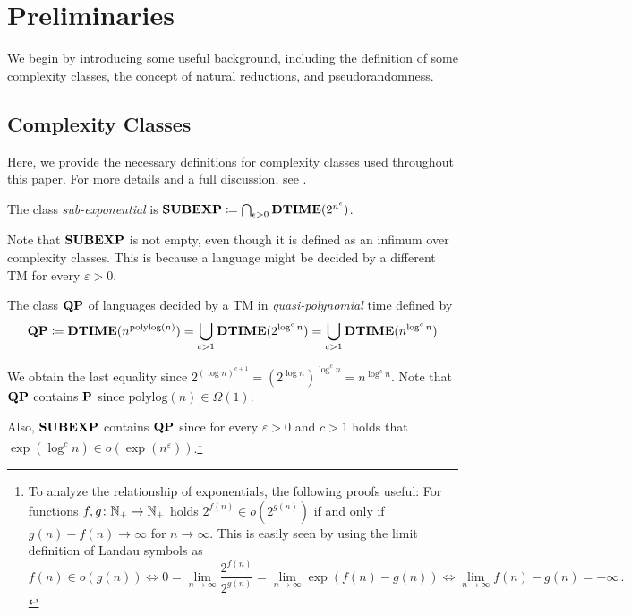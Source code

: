 \documentclass[11pt]{article}
\begin{document}
\section{Preliminaries}

We begin by introducing some useful background, including the definition
of some complexity classes, the concept of natural reductions,
and pseudorandomness.

\subsection{Complexity Classes}
Here, we provide the necessary definitions for complexity classes used
throughout this paper.
For more details and a full discussion, see \cite{arora2009}.

\begin{definition}
  The class \emph{sub-exponential} is
  $\class{SUBEXP} \coloneqq \bigcap_{\epsilon > 0} \TIME(2^{n^{\epsilon}})$.
\end{definition}

Note that $\class{SUBEXP}$ is not empty, even though it is defined as an infimum
over complexity classes. This is because a language might be decided by a
different TM for every $\varepsilon > 0$.

\begin{definition}
	The class $\class{QP}$ of languages decided by a TM in
	\emph{quasi-polynomial} time defined by
	\[
	\class{QP}
	\coloneqq
	\TIME(n^{\mathrm{polylog}(n)})
	=
	\bigcup_{c > 1}\TIME(2^{\log^c n})
	=
	\bigcup_{c > 1}\TIME(n^{\log^c n})
	\]
\end{definition}
We obtain the last equality since
$2^{(\log n)^{c+1}} = (2^{\log n})^{\log^c n} = n^{\log^c n}$.
%
Note that $\class{QP}$ contains $\P$ since
$\mathrm{polylog}(n) \in \Omega(1)$.

Also, $\class{SUBEXP}$ contains $\class{QP}$ since for every
$\varepsilon > 0$ and $c > 1$ holds that
$\exp(\log^c n) \in o(\exp(n^\varepsilon))$.\footnote{To analyze the
relationship of exponentials, the following proofs useful:
For functions $f, g \colon \N_+ \to \N_+$ holds
$2^{f(n)} \in o(2^{g(n)})$ if and only if $g(n) - f(n) \to \infty$ for
$n \to \infty$.
This is easily seen by using the limit definition of Landau symbols as
\[
  f(n) \in o(g(n))
  \iff
  0 = \lim_{n \to \infty} \frac{2^{f(n)}}{2^{g(n)}}
  = \lim_{n \to \infty} \exp(f(n) - g(n))
  \iff
  \lim_{n \to \infty} f(n) - g(n) = -\infty \,.
\]
}
\end{document}

